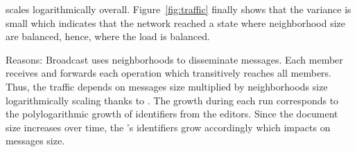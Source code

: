 \begin{asparadesc}
  \SPRAY scales logarithmically overall. Figure~\ref{fig:traffic} finally shows
  that the variance is small which indicates that the network reached a state
  where neighborhood size are balanced, hence, where the load is balanced.
\item [Reasons:] Broadcast uses neighborhoods to disseminate messages. Each
  member receives and forwards each operation which transitively reaches all
  members. Thus, the traffic depends on messages size multiplied by
  neighborhoods size logarithmically scaling thanks to \SPRAY. The growth during
  each run corresponds to the polylogarithmic growth of identifiers from the
  editors. Since the document size increases over time, the \LSEQ's identifiers
  grow accordingly which impacts on messages size.
\end{asparadesc}
